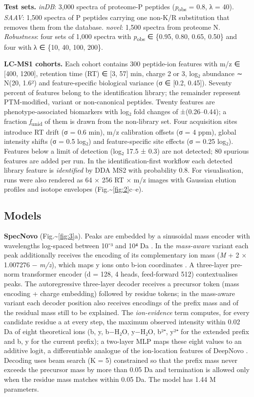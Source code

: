 \documentclass[pdflatex,sn-mathphys-num]{sn-jnl}
\begin{document}
\textbf{Test sets.} \emph{inDB}: 3,000 spectra of proteome-P peptides (\emph{p}\textsubscript{obs} = 0.8, λ = 40). \emph{SAAV}: 1,500 spectra of P peptides carrying one non-K/R substitution that removes them from the database. \emph{novel}: 1,500 spectra from proteome N. \emph{Robustness}: four sets of 1,000 spectra with \emph{p}\textsubscript{obs} ∈ \{0.95, 0.80, 0.65, 0.50\} and four with λ ∈ \{10, 40, 100, 200\}.

\textbf{LC-MS1 cohorts.} Each cohort contains 300 peptide-ion features with m/z ∈ {[}400, 1200{]}, retention time (RT) ∈ {[}3, 57{]} min, charge 2 or 3, log₂ abundance ∼ N(20, 1.6²) and feature-specific biological variance (σ ∈ {[}0.2, 0.45{]}). Seventy percent of features belong to the identification library; the remainder represent PTM-modified, variant or non-canonical peptides. Twenty features are phenotype-associated biomarkers with log₂ fold changes of ±(0.26--0.44); a fraction \emph{f}\textsubscript{unid} of them is drawn from the non-library set. Four acquisition sites introduce RT drift (σ = 0.6 min), m/z calibration offsets (σ = 4 ppm), global intensity shifts (σ = 0.5 log₂) and feature-specific site effects (σ = 0.25 log₂). Features below a limit of detection (log₂ 17.5 ± 0.3) are not detected; 80 spurious features are added per run. In the identification-first workflow each detected library feature is \emph{identified} by DDA MS2 with probability 0.8. For visualisation, runs were also rendered as 64 × 256 RT × m/z images with Gaussian elution profiles and isotope envelopes (Fig.\textasciitilde{}\ref{fig:2}c--e).

\subsection{Models}

\textbf{SpecNovo} (Fig.\textasciitilde{}\ref{fig:3}a). Peaks are embedded by a sinusoidal mass encoder with wavelengths log-spaced between 10⁻³ and 10⁴ Da \cite{yilmaz2024}. In the \emph{mass-aware} variant each peak additionally receives the encoding of its complementary ion mass (\emph{M} + 2 × 1.007276 − \emph{m/z}), which maps y ions onto b-ion coordinates \cite{yang2024}. A three-layer pre-norm transformer encoder (d = 128, 4 heads, feed-forward 512) contextualises peaks. The autoregressive three-layer decoder receives a precursor token (mass encoding + charge embedding) followed by residue tokens; in the mass-aware variant each decoder position also receives encodings of the prefix mass and of the residual mass still to be explained. The \emph{ion-evidence} term computes, for every candidate residue a at every step, the maximum observed intensity within 0.02 Da of eight theoretical ions (b, y, b−H₂O, y−H₂O, b²⁺, y²⁺ for the extended prefix and b, y for the current prefix); a two-layer MLP maps these eight values to an additive logit, a differentiable analogue of the ion-location features of DeepNovo \cite{tran2017}. Decoding uses beam search (K = 5) constrained so that the prefix mass never exceeds the precursor mass by more than 0.05 Da and termination is allowed only when the residue mass matches within 0.05 Da. The model has 1.44 M parameters.
\end{document}
